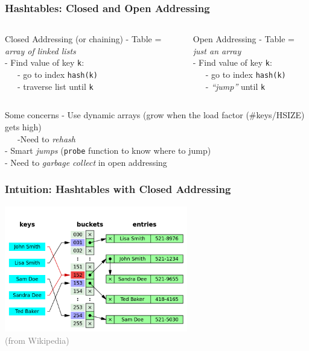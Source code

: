 \documentclass[aspectratio=169]{beamer}
\begin{document}
\begin{frame}\frametitle{Hashtables: Closed and Open Addressing}

\begin{columns}
  \begin{column}{0.48\textwidth}
    \begin{alertblock}{Closed Addressing (or chaining)}
      - Table = \emph{array of linked lists}
      \\
      - Find value of key \alert{\texttt{k}}:
      \\~~~- go to index \texttt{hash(k)}
      \\~~~- traverse list until \texttt{k}
    \end{alertblock}
  \end{column}
  \begin{column}{0.48\textwidth}
    \begin{exampleblock}{Open Addressing}
      - Table = \emph{just an array}
      \\
      - Find value of key \alert{\texttt{k}}:
      \\~~~- go to index \texttt{hash(k)}
      \\~~~- \emph{``jump''} until \texttt{k}
    \end{exampleblock}
  \end{column}
\end{columns}

\bigskip

\begin{block}{Some concerns}
  - Use dynamic arrays (grow when the \alert{load factor} (\#keys/HSIZE) gets high)
  \\~~~-Need to \emph{rehash}  
  \\- Smart \emph{jumps} (\texttt{probe} function to know where to jump)
  \\- Need to \emph{garbage collect} in open addressing
\end{block}

\end{frame}


\begin{frame}\frametitle{Intuition: Hashtables with Closed Addressing}
  \centering
  \includegraphics[width=0.6\textwidth]{images/HT-closed.png}
  \\
  {\footnotesize \textcolor{gray}{(from Wikipedia)}}
\end{frame}
\end{document}
